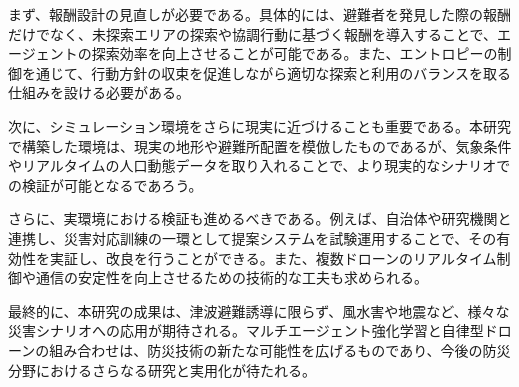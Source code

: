 まず、報酬設計の見直しが必要である。具体的には、避難者を発見した際の報酬だけでなく、未探索エリアの探索や協調行動に基づく報酬を導入することで、エージェントの探索効率を向上させることが可能である。また、エントロピーの制御を通じて、行動方針の収束を促進しながら適切な探索と利用のバランスを取る仕組みを設ける必要がある。

次に、シミュレーション環境をさらに現実に近づけることも重要である。本研究で構築した環境は、現実の地形や避難所配置を模倣したものであるが、気象条件やリアルタイムの人口動態データを取り入れることで、より現実的なシナリオでの検証が可能となるであろう。

さらに、実環境における検証も進めるべきである。例えば、自治体や研究機関と連携し、災害対応訓練の一環として提案システムを試験運用することで、その有効性を実証し、改良を行うことができる。また、複数ドローンのリアルタイム制御や通信の安定性を向上させるための技術的な工夫も求められる。

最終的に、本研究の成果は、津波避難誘導に限らず、風水害や地震など、様々な災害シナリオへの応用が期待される。マルチエージェント強化学習と自律型ドローンの組み合わせは、防災技術の新たな可能性を広げるものであり、今後の防災分野におけるさらなる研究と実用化が待たれる。
